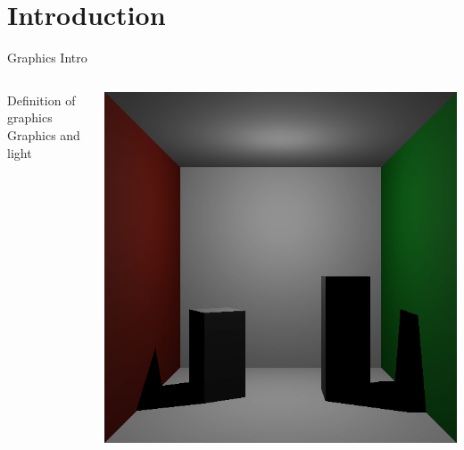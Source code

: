 \documentclass[compress,professionalfont]{beamer}
\begin{document}
\section{Introduction}
\begin{frame}{Graphics Intro}

    \begin{columns}
        \begin{column}{0.65\textwidth}
            Definition of graphics\\
            Graphics and light\\
        \end{column}
        \begin{column}{0.35\textwidth}
            \includegraphics[width=\textwidth]{../img/boxes_noindirect}
        \end{column}
    \end{columns}

\end{frame}
\end{document}
